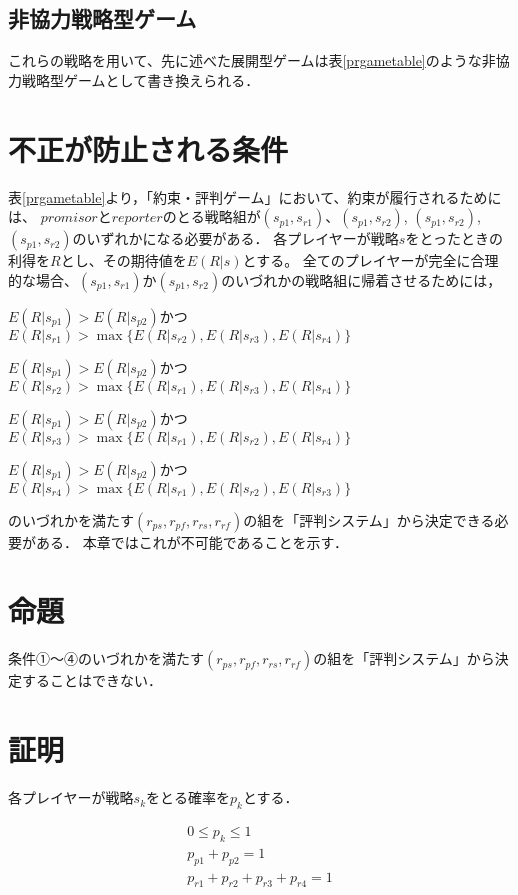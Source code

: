 \subsection{非協力戦略型ゲーム}
これらの戦略を用いて、先に述べた展開型ゲームは表\ref{prgametable}のような非協力戦略型ゲームとして書き換えられる．


\section{不正が防止される条件}
表\ref{prgametable}より，「約束・評判ゲーム」において、約束が履行されるためには、
$promisor$と$reporter$のとる戦略組が$ (s_{p1}, s_{r1})$、$(s_{p1}, s_{r2})$, $(s_{p1}, s_{r2})$, $(s_{p1}, s_{r2})$のいずれかになる必要がある．
各プレイヤーが戦略$s$をとったときの利得を$R$とし、その期待値を$E(R|s)$とする。
全てのプレイヤーが完全に合理的な場合、$(s_{p1}, s_{r1})$か$(s_{p1}, s_{r2})$のいづれかの戦略組に帰着させるためには，

\begin{description}
  \centering
  \item[条件①] $E(R|s_{p1})>E(R|s_{p2})$かつ$E(R|s_{r1})>\max\{E(R|s_{r2}), E(R|s_{r3}), E(R|s_{r4}) \}$
  \item[条件②] $E(R|s_{p1})>E(R|s_{p2})$かつ$E(R|s_{r2})>\max\{E(R|s_{r1}), E(R|s_{r3}), E(R|s_{r4}) \}$
  \item[条件③] $E(R|s_{p1})>E(R|s_{p2})$かつ$E(R|s_{r3})>\max\{E(R|s_{r1}), E(R|s_{r2}), E(R|s_{r4}) \}$
  \item[条件④] $E(R|s_{p1})>E(R|s_{p2})$かつ$E(R|s_{r4})>\max\{E(R|s_{r1}), E(R|s_{r2}), E(R|s_{r3}) \}$
\end{description}

のいづれかを満たす$(r_{ps}, r_{pf}, r_{rs}, r_{rf})$の組を「評判システム」から決定できる必要がある．
本章ではこれが不可能であることを示す．

\section{命題}
条件①〜④のいづれかを満たす$(r_{ps}, r_{pf}, r_{rs}, r_{rf})$の組を「評判システム」から決定することはできない．
  
\section{証明}
\label{verification1}
各プレイヤーが戦略$s_{k}$をとる確率を$p_{k}$とする．

\begin{gather}
  0 \leq p_{k} \leq 1 \nonumber \\
  p_{p1} + p_{p2} = 1 \nonumber \\
  p_{r1} + p_{r2} + p_{r3} + p_{r4} = 1 \label{condition1}
\end{gather}

